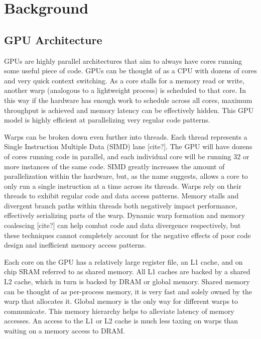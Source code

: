 \chapter{Background}

\section{GPU Architecture}
GPUs are highly parallel architectures that aim to always have cores running some useful piece of code. GPUs can be thought of as a CPU with dozens of cores and very quick context switching. As a core stalls for a memory read or write, another warp (analogous to a lightweight process) is scheduled to that core. In this way if the hardware has enough work to schedule across all cores, maximum throughput is achieved and memory latency can be effectively hidden. This GPU model is highly efficient at parallelizing very regular code patterns.

Warps can be broken down even further into threads. Each thread represents a Single Instruction Multiple Data (SIMD) lane [cite?]. The GPU will have dozens of cores running code in parallel, and each individual core will be running 32 or more instances of the same code. SIMD greatly increases the amount of parallelization within the hardware, but, as the name suggests, allows a core to only run a single instruction at a time across its threads. Warps rely on their threads to exhibit regular code and data access patterns. Memory stalls and divergent branch paths within threads both negatively impact performance, effectively serializing parts of the warp. Dynamic warp formation \cite{dynamicwarp1,dynamicwarp2} and memory coalescing [cite?] can help combat code and data divergence respectively, but these techniques cannot completely account for the negative effects of poor code design and inefficient memory access patterns.

Each core on the GPU has a relatively large register file, an L1 cache, and on chip SRAM referred to as shared memory. All L1 caches are backed by a shared L2 cache, which in turn is backed by DRAM or global memory. Shared memory can be thought of as per-process memory, it is very fast and solely owned by the warp that allocates it. Global memory is the only way for different warps to communicate. This memory hierarchy helps to alleviate latency of memory accesses. An access to the L1 or L2 cache is much less taxing on warps than waiting on a memory access to DRAM.

